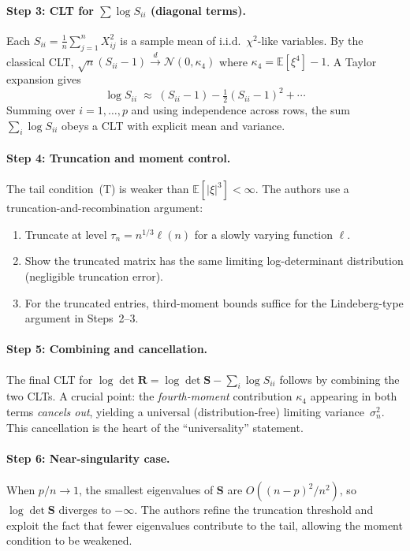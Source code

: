\documentclass[11pt,a4paper]{article}
\begin{document}
\paragraph{Step 3: CLT for $\sum\log S_{ii}$ (diagonal terms).}
Each $S_{ii} = \frac{1}{n}\sum_{j=1}^{n}X_{ij}^{2}$ is a sample mean of i.i.d.\ $\chi^2$-like variables.  By the classical CLT, $\sqrt{n}(S_{ii}-1) \xrightarrow{d} \mathcal{N}(0,\kappa_4)$ where $\kappa_4 = \mathbb{E}[\xi^4]-1$.  A Taylor expansion gives
\[
  \log S_{ii} \;\approx\; (S_{ii}-1) - \tfrac{1}{2}(S_{ii}-1)^{2} + \cdots
\]
Summing over $i=1,\dots,p$ and using independence across rows, the sum $\sum_i\log S_{ii}$ obeys a CLT with explicit mean and variance.

\paragraph{Step 4: Truncation and moment control.}
The tail condition~(T) is weaker than $\mathbb{E}[|\xi|^3]<\infty$.  The authors use a truncation-and-recombination argument:
\begin{enumerate}[nosep]
  \item Truncate at level $\tau_n = n^{1/3}\ell(n)$ for a slowly varying function $\ell$.
  \item Show the truncated matrix has the same limiting log-determinant distribution (negligible truncation error).
  \item For the truncated entries, third-moment bounds suffice for the Lindeberg-type argument in Steps~2--3.
\end{enumerate}

\paragraph{Step 5: Combining and cancellation.}
The final CLT for $\log\det\mathbf{R} = \log\det\mathbf{S} - \sum_i\log S_{ii}$ follows by combining the two CLTs.  A crucial point: the \emph{fourth-moment} contribution $\kappa_4$ appearing in both terms \emph{cancels out}, yielding a universal (distribution-free) limiting variance~$\sigma_n^2$.  This cancellation is the heart of the ``universality'' statement.

\paragraph{Step 6: Near-singularity case.}
When $p/n \to 1$, the smallest eigenvalues of $\mathbf{S}$ are $O((n-p)^2/n^2)$, so $\log\det\mathbf{S}$ diverges to $-\infty$.  The authors refine the truncation threshold and exploit the fact that fewer eigenvalues contribute to the tail, allowing the moment condition to be weakened.
\end{document}
